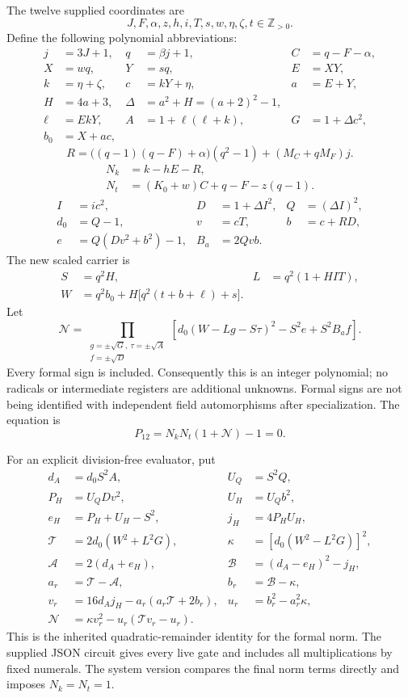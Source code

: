 The twelve supplied coordinates are
\[
 J,F,\alpha,z,h,i,T,s,w,\eta,\zeta,t\in\mathbb Z_{>0}.
\]
Define the following polynomial abbreviations:
\begin{align*}
 j&=3J+1,&q&=\beta j+1,&C&=q-F-\alpha,\\
 X&=wq,&Y&=sq,&E&=XY,\\
 k&=\eta+\zeta,&c&=kY+\eta,&a&=E+Y,\\
 H&=4a+3,&\Delta&=a^2+H=(a+2)^2-1,\\
 \ell&=EkY,&A&=1+\ell(\ell+k),&G&=1+\Delta c^2,\\
 b_0&=X+ac,&&&
\end{align*}
\[
 R=\bigl((q-1)(q-F)+\alpha\bigr)(q^2-1)+(M_C+qM_F)j.
\]
\begin{align*}
 N_k&=k-hE-R,\\
 N_t&=(K_0+w)C+q-F-z(q-1).
\end{align*}
\begin{align*}
 I&=ic^2,&D&=1+\Delta I^2,&Q&=(\Delta I)^2,\\
 d_0&=Q-1,&v&=cT,&b&=c+RD,\\
 e&=Q(Dv^2+b^2)-1,&B_a&=2Qvb.
\end{align*}
The new scaled carrier is
\begin{align*}
 S&=q^2H,&L&=q^2(1+HIT),\\
 W&=q^2b_0+H\bigl[q^2(t+b+\ell)+s\bigr].
\end{align*}
Let
\begin{equation}
 \mathcal N=
 \prod_{\substack{g=\pm\sqrt G,\ \tau=\pm\sqrt A\\f=\pm\sqrt D}}
 \left[d_0(W-Lg-S\tau)^2-S^2e+S^2B_af\right].
 \label{eq:twelve-norm}
\end{equation}
Every formal sign is included. Consequently this is an integer polynomial;
no radicals or intermediate registers are additional unknowns. Formal signs
are not being identified with independent field automorphisms after
specialization. The equation is
\begin{equation}
 \boxed{P_{12}=N_kN_t(1+\mathcal N)-1=0.}
 \label{eq:twelve-final}
\end{equation}

For an explicit division-free evaluator, put
\begin{align*}
 d_A&=d_0S^2A,&U_Q&=S^2Q,\\
 P_H&=U_QDv^2,&U_H&=U_Qb^2,\\
 e_H&=P_H+U_H-S^2,&j_H&=4P_HU_H,\\
 \mathcal T&=2d_0(W^2+L^2G),&
 \kappa&=[d_0(W^2-L^2G)]^2,\\
 \mathcal A&=2(d_A+e_H),&
 \mathcal B&=(d_A-e_H)^2-j_H,\\
 a_r&=\mathcal T-\mathcal A,&b_r&=\mathcal B-\kappa,\\
 v_r&=16d_Aj_H-a_r(a_r\mathcal T+2b_r),&
 u_r&=b_r^2-a_r^2\kappa,\\
 \mathcal N&=\kappa v_r^2-u_r(\mathcal T v_r-u_r).
\end{align*}
This is the inherited quadratic-remainder identity for the formal norm.
The supplied JSON circuit gives every live gate and includes all
multiplications by fixed numerals. The system version compares the final
norm terms directly and imposes $N_k=N_t=1$.

